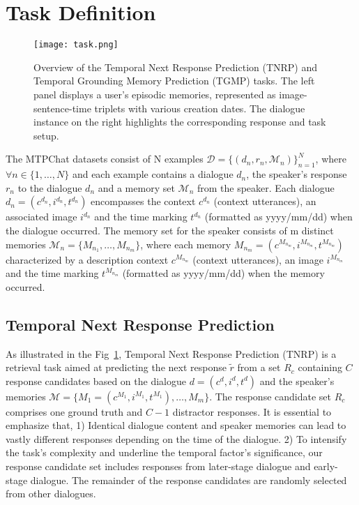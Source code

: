 \section{Task Definition}

\begin{figure*}[h]
\centering
  \texttt{[image: task.png]}
  \vspace{-2mm}
  \caption{Overview of the Temporal Next Response Prediction (TNRP) and Temporal Grounding Memory Prediction (TGMP) tasks. The left panel displays a user’s episodic memories, represented as image-sentence-time triplets with various creation dates. The dialogue instance on the right highlights the corresponding response and task setup. }
    \label{task}
\vspace{-4mm}
 \end{figure*}


The MTPChat datasets consist of N examples $\mathcal{D}=\{({d}_n, r_n, \mathcal{M}_n)\}_{n=1}^N$, where \( \forall n \in \{1, \ldots, N\} \) and each example contains a dialogue ${d}_n$, the speaker's response ${r}_n$ to the dialogue ${d}_n$ and a memory set $\mathcal{M}_n$ from the speaker. Each dialogue $d_n=(c^{d_n}, {i}^{d_n}, t^{d_n})$ encompasses the context $c^{d_n}$ (context utterances), an associated image ${i}^{d_n}$ and the time 
marking ${t}^{d_n}$ (formatted as yyyy/mm/dd) when the dialogue occurred. The memory set for the speaker consists of m distinct memories $\mathcal{M}_n=\{M_{n_1},\ldots,M_{n_m}\}$, where each memory $M_{n_m} = (c^{M_{n_m}}, i^{M_{n_m}}, t^{M_{n_m}})$ characterized by a description context $c^{M_{n_m}}$ (context utterances), an image $i^{M_{n_m}}$ and the time marking $t^{M_{n_m}}$ (formatted as yyyy/mm/dd) when the memory occurred.



\subsection{Temporal Next Response Prediction}

As illustrated in the Fig~\ref{task}, Temporal Next Response Prediction (TNRP) is a retrieval task aimed at predicting the next response $\tilde{r}$ from a set $R_c$ containing $C$ response candidates based on the dialogue $d=(c^{d}, {i}^{d}, t^{d})$ and the speaker's memories $\mathcal{M}=\{M_{1}=(c^{M_{1}}, i^{M_{1}}, t^{M_{1}}),\ldots,M_{m}\}$. The response candidate set $R_c$ comprises one ground truth and $C-1$ distractor responses. It is essential to emphasize that, 1) Identical dialogue content and speaker memories can lead to vastly different responses depending on the time of the dialogue. 2) To intensify the task's complexity and underline the temporal factor's significance, our response candidate set includes responses from later-stage dialogue and early-stage dialogue. The remainder of the response candidates are randomly selected from other dialogues. 

